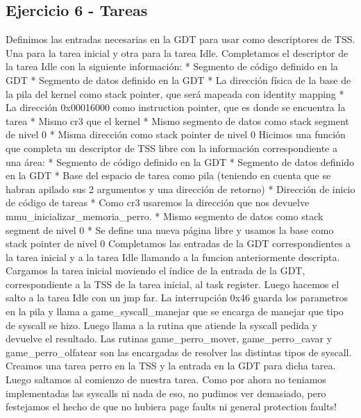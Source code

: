 \documentclass[10pt,a4paper,spanish]{article}
\begin{document}
\subsection{Ejercicio 6 - Tareas}
Definimos las entradas necesarias en la GDT para usar como descriptores de TSS. Una para la tarea inicial y otra para la tarea Idle.
Completamos el descriptor de la tarea Idle con la siguiente información:
* Segmento de código definido en la GDT
* Segmento de datos definido en la GDT
* La dirección física de la base de la pila del kernel como stack pointer, que será mapeada con identity mapping
* La dirección 0x00016000 como instruction pointer, que es donde se encuentra la tarea
* Mismo cr3 que el kernel
* Mismo segmento de datos como stack segment de nivel 0
* Misma dirección como stack pointer de nivel 0
Hicimos una función que completa un descriptor de TSS libre con la información correspondiente a una área:
* Segmento de código definido en la GDT
* Segmento de datos definido en la GDT
* Base del espacio de tarea como pila (teniendo en cuenta que se habran apilado sus 2 argumentos y una dirección de retorno)
* Dirección de inicio de código de tareas
* Como cr3 usaremos la dirección que nos devuelve mmu_inicializar_memoria_perro.
* Mismo segmento de datos como stack segment de nivel 0
* Se define una nueva página libre y usamos la base como stack pointer de nivel 0
Completamos las entradas de la GDT correspondientes a la tarea inicial y a la tarea Idle llamando a la funcion anteriormente descripta.
Cargamos la tarea inicial moviendo el índice de la entrada de la GDT, correspondiente a la TSS de la tarea inicial, al task register. Luego hacemos el salto a la tarea Idle con un jmp far.
La interrupción 0x46 guarda los parametros en la pila y llama a game_syscall_manejar que se encarga de manejar que tipo de syscall se hizo. Luego llama a la rutina que atiende la syscall pedida y devuelve el resultado. Las rutinas game_perro_mover, game_perro_cavar y game_perro_olfatear son las encargadas de resolver las distintas tipos de syscall.
Creamos una tarea perro en la TSS y la entrada en la GDT para dicha tarea. Luego saltamos al comienzo de nuestra tarea. Como por ahora no teniamos implementadas las syscalls ni nada de eso, no pudimos ver demasiado, pero festejamos el hecho de que no hubiera page faults ni general protection faults!
\end{document}
